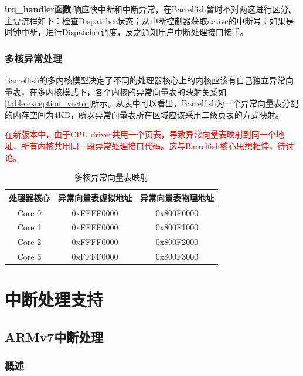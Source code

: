 \documentclass[a4paper, 12pt]{report}
\begin{document}
    \textbf{irq\_handler函数}:响应快中断和中断异常，在Barrelfish暂时不对两这进行区分。主要流程如下：检查Dispatcher状态；从中断控制器获取active的中断号；如果是时钟中断，进行Dispatcher调度，反之通知用户中断处理接口接手。
    
    \subsection{多核异常处理}
    
    Barrelfish的多内核模型决定了不同的处理器核心上的内核应该有自己独立异常向量表，在多内核模式下，各个内核的异常向量表的映射关系如\autoref{table:exception_vector}所示。从表中可以看出，Barrelfish为一个异常向量表分配的内存空间为4KB，所以异常向量表所在区域应该采用二级页表的方式映射。
    
    \textcolor{red}{在新版本中，由于CPU driver共用一个页表，导致异常向量表映射到同一个地址，所有内核共用同一段异常处理接口代码。这与Barrelfish核心思想相悖，待讨论。}
    
    \begin{table}[htbp]
        \centering
        \caption{多核异常向量表映射}
        \label{table:exception_vector}
        \begin{tabular}{ccc}
            \toprule
            处理器核心 & 异常向量表虚拟地址 & 异常向量表物理地址  \\
            \midrule
            Core 0 & 0xFFFF0000 & 0x800F0000  \\
            Core 1 & 0xFFFF0000 & 0x800F1000  \\
            Core 2 & 0xFFFF0000 & 0x800F2000  \\
            Core 3 & 0xFFFF0000 & 0x800F3000  \\
            \bottomrule
        \end{tabular}
    \end{table}
    
    \chapter{中断处理支持}
    
    \section{ARMv7中断处理}
    
    \subsection{概述}
    
\end{document}
